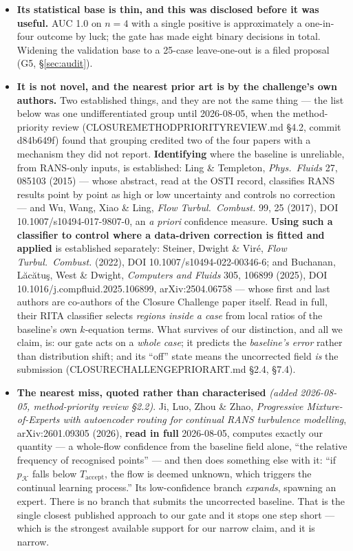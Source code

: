 \documentclass[11pt,a4paper]{article}
\newcommand{\breakus}{\textunderscore\allowbreak}
\newcommand{\code}[1]{{\small\ttfamily\let\_\breakus #1}}
\newcommand{\artifact}[1]{{\footnotesize\ttfamily\let\_\breakus #1}}
\begin{document}
\begin{itemize}
\item \textbf{Its statistical base is thin, and this was disclosed before it was
  useful.} AUC 1.0 on $n=4$ with a single positive is approximately a one-in-four
  outcome by luck; the gate has made eight binary decisions in total. Widening the
  validation base to a 25-case leave-one-out is a filed proposal (G5,
  \S\ref{sec:audit}).
\item \textbf{It is not novel, and the nearest prior art is by the challenge's own
  authors.} Two established things, and they are not the same thing --- the list below
  was one undifferentiated group until 2026-08-05, when the method-priority review
  (\artifact{CLOSURE\_METHOD\_PRIORITY\_REVIEW.md} \S4.2, commit \code{d84b649f}) found
  that grouping credited two of the four papers with a mechanism they did not report.
  \textbf{Identifying} where the baseline is unreliable, from RANS-only inputs, is
  established: Ling \&
  Templeton, \emph{Phys.\ Fluids} 27, 085103 (2015) --- whose abstract, read at the OSTI
  record, classifies RANS results point by point as high or low uncertainty and controls
  no correction --- and Wu, Wang, Xiao \& Ling,
  \emph{Flow Turbul.\ Combust.} 99, 25 (2017), DOI 10.1007/s10494-017-9807-0, an
  \emph{a priori} confidence measure. \textbf{Using such a classifier to control where a
  data-driven correction is fitted and applied} is established separately: Steiner,
  Dwight \& Vir\'e, \emph{Flow Turbul.\ Combust.} (2022), DOI 10.1007/s10494-022-00346-6;
  and Buchanan, L\u{a}c\u{a}tu\c{s}, West \& Dwight, \emph{Computers and Fluids} 305,
  106899 (2025), DOI 10.1016/j.compfluid.2025.106899, arXiv:2504.06758 --- whose first
  and last authors are co-authors of the Closure Challenge paper itself. Read in full,
  their RITA classifier selects \emph{regions inside a case} from local ratios of the
  baseline's own $k$-equation terms. What survives of our distinction, and all we claim,
  is: our gate acts on a \emph{whole case}; it predicts the \emph{baseline's error}
  rather than distribution shift; and its ``off'' state means the uncorrected field
  \emph{is} the submission
  (\artifact{CLOSURE\_CHALLENGE\_PRIOR\_ART.md} \S2.4, \S7.4).
\item \textbf{The nearest miss, quoted rather than characterised} \emph{(added
  2026-08-05, method-priority review \S2.2)}. Ji, Luo, Zhou \& Zhao, \emph{Progressive
  Mixture-of-Experts with autoencoder routing for continual RANS turbulence modelling},
  arXiv:2601.09305 (2026), \textbf{read in full} 2026-08-05, computes exactly our
  quantity --- a whole-flow confidence from the baseline field alone, ``the relative
  frequency of recognised points'' --- and then does something else with it: ``if
  $p_\mathcal{K}$ falls below $T_{\text{accept}}$, the flow is deemed unknown, which
  triggers the continual learning process.'' Its low-confidence branch \emph{expands},
  spawning an expert. There is no branch that submits the uncorrected baseline. That is
  the single closest published approach to our gate and it stops one step short --- which
  is the strongest available support for our narrow claim, and it is narrow.
\end{itemize}
\end{document}
